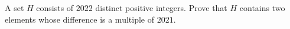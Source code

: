 A set $H$ consists of $2022$ distinct positive integers. Prove that $H$ contains two elements whose difference is a multiple of $2021$.
